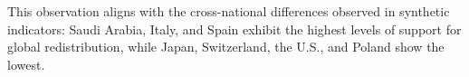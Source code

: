 \documentclass[12pt,english]{article}
\begin{document}
This observation aligns with the cross-national differences observed in synthetic indicators: Saudi Arabia, Italy, and Spain exhibit the highest levels of support for global redistribution, while Japan, Switzerland, the U.S., and Poland show the lowest. 

\end{document}
